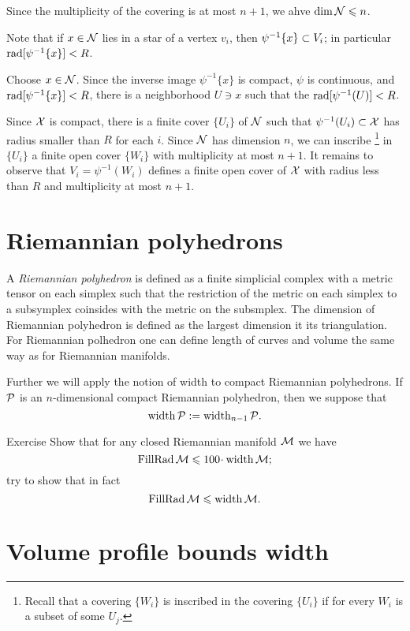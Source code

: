 Since the multiplicity of the covering is at most $n+1$, we ahve $\operatorname{\rm dim}\nolimits \mathcal{N}\leqslant n$.

Note that if $x\in \mathcal{N}$ lies in a star of a vertex $v_i$,
then $\psi^{-1}\{x\}\z\subset V_i$;
in particular $\mathop{\rm rad}\nolimits[\psi^{-1}\{x\}]<R$.

Choose $x\in \mathcal{N}$.
Since the inverse image $\psi^{-1}\{x\}$ is compact, $\psi$ is continuous, and $\mathop{\rm rad}\nolimits[\psi^{-1}\{x\}]<R$,
there is a neighborhood $U\ni x$ such that the  $\mathop{\rm rad}\nolimits[\psi^{-1}(U)]<R$.

Since $\mathcal{X}$ is compact,  there is a finite cover $\{U_i\}$ of $\mathcal{N}$ such that $\psi^{-1}(U_i)\subset\mathcal{X}$ has radius smaller than $R$ for each $i$.
Since $\mathcal{N}$ has dimension $n$, we can inscribe%
\footnote{Recall that a covering $\{W_i\}$ is inscribed in the covering $\{U_i\}$ if for every $W_i$ is a subset of some $U_j$.} 
in $\{U_i\}$ a finite open cover $\{W_i\}$ with multiplicity at most $n+1$.
It remains to observe that $V_i=\psi^{-1}(W_i)$ defines a finite open cover of $\mathcal{X}$ with radius less than $R$ and multiplicity at most $n+1$. 
\qeds

\section{Riemannian polyhedrons}

A \emph{Riemannian polyhedron} is defined as a finite simplicial complex with a metric tensor on each simplex such that the restriction of the metric on each simplex to a subsymplex coinsides with the metric on the subsmplex.
The dimension of Riemannian polyhedron is defined as the largest dimension it its triangulation.
For Riemannian polhedron one can define length of curves and volume the same way as for Riemannian manifolds.


Further we will apply the notion of width to compact Riemannian polyhedrons.
If $\mathcal{P}$ is an $n$-dimensional compact Riemannian polyhedron, then 
we suppose that
\[\operatorname{\rm width}\nolimits\mathcal{P}\mathrel{:=}\operatorname{\rm width}\nolimits_{n-1}\mathcal{P}.\]

\begin{thm}{Exercise}\label{ex:FillRad<width}
Show that for any closed Riemannian manifold $\mathcal{M}$ we have
\[\FillRad \spc{M}\le 100\cdot \width\spc{M};\]
try to show that in fact
\[\operatorname{\rm FillRad} \mathcal{M}\leqslant \operatorname{\rm width}\nolimits\mathcal{M}.\]

\end{thm}

\section{Volume profile bounds width}

